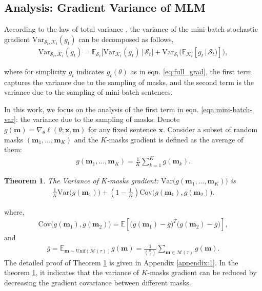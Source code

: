 \documentclass{article} \usepackage{iclr2021_conference,times}
\newcommand{\Var}{\mathrm{Var}}
\newcommand{\Cov}{\mathrm{Cov}}
\theoremstyle{plain}
\newcommand{\EE}{\mathbb{E}}
\newtheorem{theorem}{Theorem}
\begin{document}
\subsection{Analysis: Gradient Variance of MLM}
\vspace{-2mm}
\label{sec:mlm_variance}
According to the law of total variance \citep{neil_acourse_in_probability}, the variance of the mini-batch stochastic gradient $\Var_{\mathcal{S}_t,\mathcal{K}_t}(g_t)$ can be decomposed as follows, 
\begin{align}
\Var_{\mathcal{S}_t,\mathcal{K}_t}(g_t) 
= \EE_{\mathcal{S}_t}\bigl[\Var_{\mathcal{K}_t}(g_t)\,|\,\mathcal{S}_t\bigr]
+\Var_{\mathcal{S}_t}\bigl(\EE_{\mathcal{K}_t}\left[g_t\,|\, \mathcal{S}_t)\right]\bigr),
\label{eqn:mini-batch-var}
\end{align}

where for simplicity $g_t$ indicates $g_t(\theta)$ as in eqn. \ref{eq:full_grad}, the first term captures the variance due to the sampling of masks, and the second term is the variance due to the sampling of mini-batch sentences.



In this work, we focus on the analysis of the first term in eqn. \ref{eqn:mini-batch-var}: the variance due to the sampling of masks. Denote
$g(\mathbf{m})=\nabla_{\!\theta} \ell(\theta;\mathbf{x},\mathbf{m})$ for any fixed sentence $\mathbf{x}$. Consider a subset of random masks
$(\mathbf{m}_1,\ldots,\mathbf{m}_K)$ and the $K$-masks gradient is defined as the average of them: 
\begin{align}
\label{eq:grad}
g(\mathbf{m}_1,\ldots,\mathbf{m}_K) = \frac{1}{K}\sum_{k=1}^K g(\mathbf{m}_k).
\end{align}

\begin{theorem}
\label{varmlm}
The Variance of $K$-masks gradient:  $\Var\bigl(g(\mathbf{m}_1,\ldots,\mathbf{m}_K)\bigr)$ is
\begin{align}
\label{var_k_mask}
\frac{1}{K} \Var\bigl(g(\mathbf{m}_1)\bigr) + \left(1-\frac{1}{K}\right)\Cov\bigl(g(\mathbf{m}_1),g(\mathbf{m}_2)\bigr).
\end{align}
\end{theorem}
where, 
\vspace{-6mm}
\begin{align}
\Cov\bigl(g(\mathbf{m}_1),g(\mathbf{m}_2)\bigr) 
= \EE\left[\bigl(g(\mathbf{m}_1) - \bar{g}\bigr)^T\bigl(g(\mathbf{m}_2) - \bar{g}\bigr)\right], 
\end{align}
and 
\vspace{-6mm}
\begin{align}
\bar{g}=\EE_{\mathbf{m}\sim\mathrm{Unif}(\mathcal{M}(\tau))} g(\mathbf{m})
=\frac{1}{\binom{n}{\tau}}\sum_{\mathbf{m}\in\mathcal{M}(\tau)} g(\mathbf{m}).
\end{align}
The detailed proof of Theorem \ref{varmlm} is given in Appendix \ref{appendix:1}. In the theorem \ref{varmlm}, it indicates that the variance of $K$-masks gradient can be reduced by decreasing the gradient covariance between different masks.
\vspace{-2mm}
\end{document}
